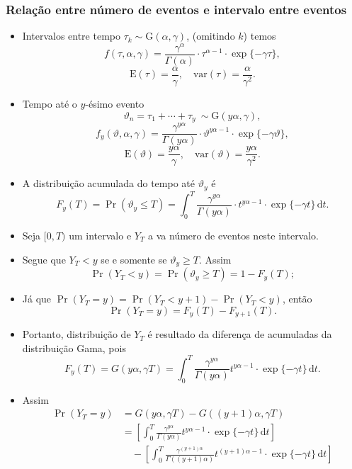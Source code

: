 \documentclass[10pt, aspectratio=169]{beamer}\usepackage[]{graphicx}\usepackage[]{color}
\begin{document}
\begin{frame}[allowframebreaks]
  \frametitle{Relação entre número de eventos e intervalo entre eventos}
  \begin{itemize}
  \item Intervalos entre tempo $\tau_k \sim \text{G}(\alpha,\gamma)$,
  (omitindo $k$) temos
    $$f(\tau, \alpha, \gamma) = \frac{\gamma^\alpha}{\Gamma(\alpha)}
    \cdot \tau^{\alpha-1}\cdot \exp\{-\gamma\tau\},$$
    $$ \text{E}(\tau) = \frac{\alpha}{\gamma}, \quad
    \text{var}(\tau) = \frac{\alpha}{\gamma^2}.$$
  \item Tempo até o $y$-ésimo evento
    $$\vartheta_n = \tau_1+\cdots+\tau_y ~ \sim
    \text{G}(y\alpha, \gamma),$$
    $$f_y(\vartheta, \alpha, \gamma) =
    \frac{\gamma^{y\alpha}}{\Gamma(y\alpha)}\cdot
    \vartheta^{y\alpha-1}\cdot \exp\{-\gamma\vartheta\},$$
    $$ \text{E}(\vartheta) = \frac{y\alpha}{\gamma}, \quad
    \text{var}(\vartheta) = \frac{y\alpha}{\gamma^2}.$$

    \framebreak

  \item A distribuição acumulada do tempo até $\vartheta_{y}$ é
    $$F_y(T) = \Pr(\vartheta_y \leq T) = \int_{0}^{T}
    \frac{\gamma^{y\alpha}}{\Gamma(y\alpha)}\cdot t^{y\alpha-1}\cdot
    \exp\{-\gamma t\}\,\text{d}t.$$
  \item Seja $[0,T)$ um intervalo e $Y_{T}$ a va número de eventos
    neste intervalo.
  \item Segue que $Y_T < y$ se e somente se $\vartheta_y \geq
    T$. Assim
    $$\Pr(Y_T < y) = \Pr(\vartheta_y \geq T) = 1-F_y(T);$$
  \item Já que $\Pr(Y_T = y) = \Pr(Y_T < y+1) - \Pr(Y_T < y)$, então
    $$\Pr(Y_T = y) = F_y(T) - F_{y+1}(T).$$

    \framebreak

  \item Portanto, distribuição de $Y_T$ é resultado da diferença de
    acumuladas da distribuição Gama, pois
    \begin{equation}
      F_y(T) = G(y\alpha, \gamma T) =
      \int_{0}^{T} \frac{\gamma^{y\alpha}}{\Gamma(y\alpha)}
      t^{y\alpha-1}\cdot\exp\{-\gamma t\}\, \text{d}t.
    \end{equation}
  \item Assim
    \begin{align*}
      \Pr(Y_T=y) &= G(y\alpha, \gamma T) - G((y+1)\alpha, \gamma T) \\
                 &= \left[ \int_{0}^{T}
                   \frac{\gamma^{y\alpha}}{\Gamma(y\alpha)}
                   t^{y\alpha-1}\cdot
                   \exp\{-\gamma t\}\, \text{d}t \right] \\
                 &\quad -
                   \left[ \int_{0}^{T}
                   \frac{\gamma^{(y+1)\alpha}}{\Gamma((y+1)\alpha)}
                   t^{(y+1)\alpha-1}\cdot
                   \exp\{-\gamma t\}\, \text{d}t \right]
    \end{align*}
  \end{itemize}
\end{frame}
\end{document}
